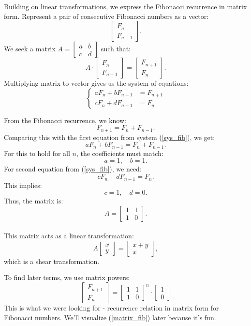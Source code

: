 \documentclass{article}
\begin{document}
Building on linear transformations, we express the Fibonacci recurrence in matrix form. Represent a pair of consecutive Fibonacci numbers as a vector:
\[
\begin{bmatrix} F_n \\ F_{n-1} \end{bmatrix}.
\]
We seek a matrix \( A = \begin{bmatrix} a & b \\ c & d \end{bmatrix} \) such that:
\[
A \cdot \begin{bmatrix} F_n \\ F_{n-1} \end{bmatrix} = \begin{bmatrix} F_{n+1} \\ F_n \end{bmatrix}.
\]
Multiplying matrix to vector gives us the system of equations:
\begin{equation}
	\left\{
	\begin{aligned}
		a F_n + b F_{n-1} &= F_{n+1}\\
		c F_n + d F_{n-1} &= F_n
	\end{aligned}
	\right.
	\label{sys_fib}
\end{equation}

From the Fibonacci recurrence, we know:
\[
F_{n+1} = F_n + F_{n-1}.
\]
Comparing this with the first equation from system (\ref{sys_fib}), we get:
\[
a F_n + b F_{n-1} = F_n + F_{n-1}.
\]
For this to hold for all \( n \), the coefficients must match:
\[
a = 1, \quad b = 1.
\]
For second equation from (\ref{sys_fib}), we need:
\[
c F_n + d F_{n-1} = F_n.
\]
This implies:
\[
c = 1, \quad d = 0.
\]
Thus, the matrix is:
\[
A = \begin{bmatrix} 1 & 1 \\ 1 & 0 \end{bmatrix}.
\]
\\
This matrix acts as a linear transformation:
\[
A \begin{bmatrix} x \\ y \end{bmatrix} = \begin{bmatrix} x + y \\ x \end{bmatrix},
\]
which is a shear transformation. 

To find later terms, we use matrix powers:
\begin{equation}
	\begin{bmatrix} F_{n+1} \\ F_n \end{bmatrix} = \begin{bmatrix} 1 & 1 \\ 1 & 0 \end{bmatrix}^n \cdot \begin{bmatrix} 1 \\ 0 \end{bmatrix}
	\label{matrix_fib}
\end{equation}
This is what we were looking for - recurrence relation in matrix form for Fibonacci numbers. We'll visualize (\ref{matrix_fib}) later because it's fun.
\end{document}
